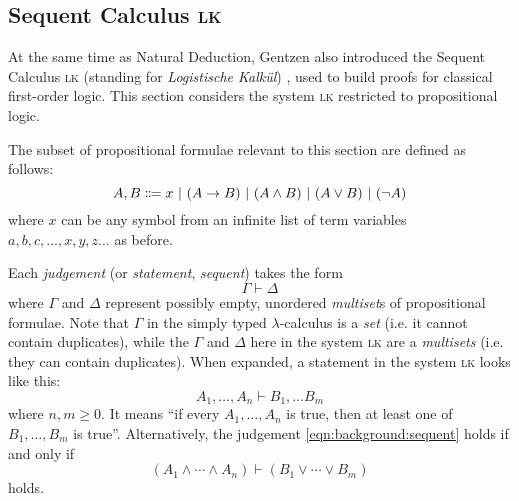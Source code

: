 \subsection{Sequent Calculus \textsc{lk}}
At the same time as Natural Deduction, Gentzen also introduced the Sequent Calculus \textsc{lk} (standing for \textit{Logistische Kalkül}) \cite{gentzen:1969}, used to build proofs for classical first-order logic. This section considers the system \textsc{lk} restricted to propositional logic.

\begin{definition}
    The subset of propositional formulae relevant to this section are defined as follows:
    \[
        A, B \Coloneqq x \ |\  (A \to B) \ |\  (A \land B) \ |\  (A \lor B) \ |\  (\lnot A)
    \]
    where $x$ can be any symbol from an infinite list of term variables $a, b, c, \ldots, x, y, z \ldots$ as before.
\end{definition}
\begin{definition}
Each \textit{judgement} (or \textit{statement}, \textit{sequent}) takes the form
\[
    \Gamma \vdash \Delta
\]
where $\Gamma$ and $\Delta$ represent possibly empty, unordered \textit{multiset}s of propositional formulae. Note that $\Gamma$ in the simply typed $\lambda$-calculus is a \textit{set} (i.e. it cannot contain duplicates), while the $\Gamma$ and $\Delta$ here in the system \textsc{lk} are a \textit{multisets} (i.e. they can contain duplicates). When expanded, a statement in the system \textsc{lk} looks like this:
\begin{equation}
    \label{eqn:background:sequent}
    A_1, \ldots, A_n \vdash B_1, \ldots B_m
\end{equation}
where $n, m \geq 0$. It means ``if every $A_1, \ldots, A_n$ is true, then at least one of $B_1, \ldots, B_m$ is true''. Alternatively, the judgement \ref{eqn:background:sequent} holds if and only if
\[
    (A_1 \land \cdots \land A_n) \vdash (B_1 \lor \cdots \lor B_m)
\]
holds.
\end{definition}

